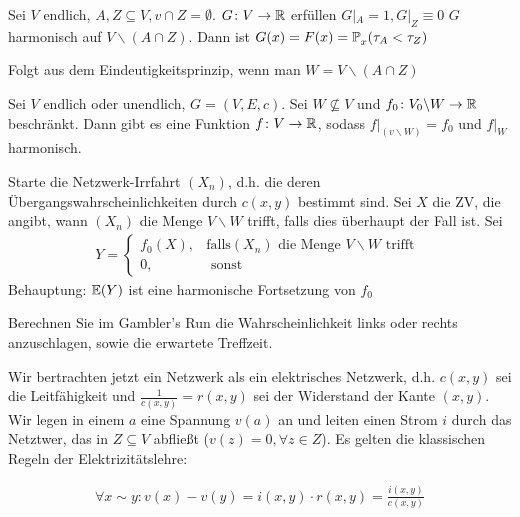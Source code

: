 \begin{korollar}
	\label{kor:1-7}
	Sei $V$ endlich, $A,Z \subseteq V, v \cap Z = \emptyset$. $G \colon V \to \mathbb{R}$ erfüllen $G|_A = 1, G|_Z \equiv 0$ $G$ harmonisch auf $V \backslash (A \cap Z)$. Dann ist $G(x) = F(x) = \prop{\tau_A < \tau_Z}[][x]$
\end{korollar}
\begin{beweis}
	Folgt aus dem Eindeutigkeitsprinzip, wenn man $W = V\backslash (A \cap Z)$
\end{beweis}

\begin{satz}[Existenzprinzip]
	Sei $V$ endlich oder unendlich, $G = (V,E,c)$. Sei $W \nsubseteq V$ und $f_0 \colon V_0 \backslash W \to \mathbb{R}$ beschränkt. Dann gibt es eine Funktion $f \colon V \to \mathbb{R}$, sodass $f|_(v \backslash W) = f_0$ und $f|_W$ harmonisch.
\end{satz}

\begin{beweis}
	Starte die Netzwerk-Irrfahrt $(X_n)$, d.h. die deren Übergangswahrscheinlichkeiten durch $c(x,y)$ bestimmt sind. Sei $X$ die ZV, die angibt, wann $(X_n)$ die Menge $V \backslash W$ trifft, falls dies überhaupt der Fall ist. Sei
	\begin{gather}
		Y = 
		\begin{cases}
			f_0(X), & \text{falls} (X_n) \text{ die Menge } V \backslash W \text{ trifft } \\
			0, & \text{ sonst}
		\end{cases}
	\end{gather}
	Behauptung: $\EW{Y}$ ist eine harmonische Fortsetzung von $f_0$
\end{beweis}
\begin{uebung}
	Berechnen Sie im Gambler's Run die Wahrscheinlichkeit links oder rechts anzuschlagen, sowie die erwartete Treffzeit.
\end{uebung}
Wir bertrachten jetzt ein Netzwerk als ein elektrisches Netzwerk, d.h. $c(x,y)$ sei die Leitfähigkeit und $\frac{1}{c(x,y)} = r(x,y)$ sei der Widerstand der Kante $(x,y)$. Wir legen in einem $a$ eine Spannung $v(a)$ an und leiten einen Strom $i$ durch das Netztwer, das in $Z \subseteq V$ abfließt ($v(z) = 0, \forall z \in Z$). Es gelten die klassischen Regeln der Elektrizitätslehre:

\begin{regel}
	\label{regel:ohm}
	\begin{align}
		\forall x\sim y: v(x)-v(y) = i(x,y) \cdot r(x,y) = \frac{i(x,y)}{c(x,y)}
	\end{align}
\end{regel}

